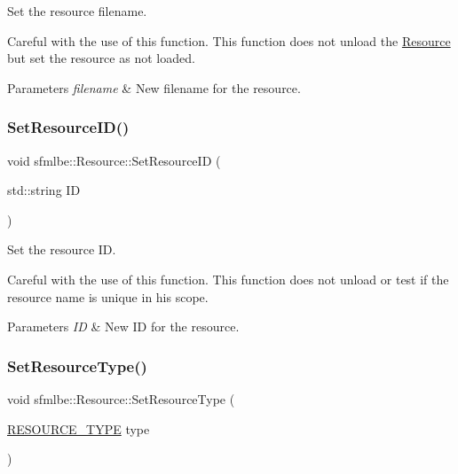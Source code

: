Set the resource filename. 

Careful with the use of this function. This function does not unload the \mbox{\hyperlink{classsfmlbe_1_1_resource}{Resource}} but set the resource as not loaded. 
\begin{DoxyParams}{Parameters}
{\em filename} & New filename for the resource. \\
\hline
\end{DoxyParams}
\mbox{\label{classsfmlbe_1_1_resource_a5f3c845ac15aa355434fe79baca5a019}} 
\subsubsection{\texorpdfstring{Set\+Resource\+I\+D()}{SetResourceID()}}
{\footnotesize\ttfamily void sfmlbe\+::\+Resource\+::\+Set\+Resource\+ID (\begin{DoxyParamCaption}\item[{std\+::string}]{ID }\end{DoxyParamCaption})\hspace{0.3cm}{\ttfamily [inline]}}



Set the resource ID. 

Careful with the use of this function. This function does not unload or test if the resource name is unique in his scope. 
\begin{DoxyParams}{Parameters}
{\em ID} & New ID for the resource. \\
\hline
\end{DoxyParams}
\mbox{\label{classsfmlbe_1_1_resource_a6d4c41250bf66f2fe81d4a53d867c4ed}} 
\subsubsection{\texorpdfstring{Set\+Resource\+Type()}{SetResourceType()}}
{\footnotesize\ttfamily void sfmlbe\+::\+Resource\+::\+Set\+Resource\+Type (\begin{DoxyParamCaption}\item[{\mbox{\hyperlink{namespacesfmlbe_ac4335ed3060bba025f73e01f9dccb2dd}{R\+E\+S\+O\+U\+R\+C\+E\+\_\+\+T\+Y\+PE}}}]{type }\end{DoxyParamCaption})\hspace{0.3cm}{\ttfamily [inline]}}



